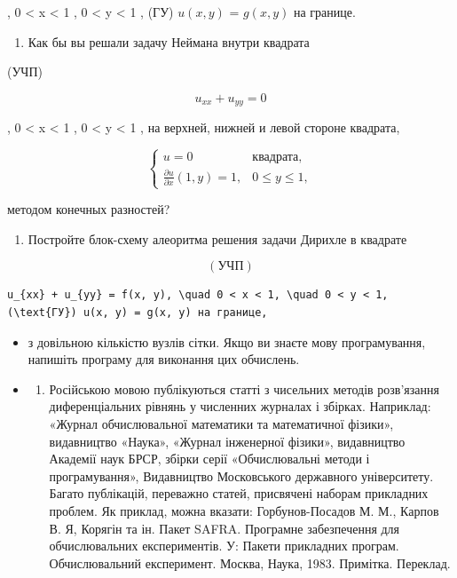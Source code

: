 \documentclass[
  ukrainian,
]{article}
\providecommand{\tightlist}{%
  \setlength{\itemsep}{0pt}\setlength{\parskip}{0pt}}
\begin{document}
, 0 \textless{} x \textless{} 1 , 0 \textless{} y \textless{} 1 , (ГУ)
\(u(x, y)\) = \(g(x, y)\) на границе.

\begin{enumerate}
\def\labelenumi{\arabic{enumi}.}
\setcounter{enumi}{4}
\tightlist
\item
  Как бы вы решали задачу Неймана внутри квадрата
\end{enumerate}

(УЧП)

\[
u_{xx} + u_{yy} = 0
\]

, 0 \textless{} x \textless{} 1 , 0 \textless{} y \textless{} 1 , на
верхней, нижней и левой стороне квадрата,

\[
\begin{cases} u = 0 & \text{квадрата,} \\ \frac{\partial u}{\partial x}(1, y) = 1, & 0 \leqslant y \leqslant 1, \end{cases}
\]

методом конечных разностей?

\begin{enumerate}
\def\labelenumi{\arabic{enumi}.}
\setcounter{enumi}{5}
\tightlist
\item
  Постройте блок-схему алеоритма решения задачи Дирихле в квадрате
\end{enumerate}

\[
(\text{УЧП})
\]

\begin{verbatim}
u_{xx} + u_{yy} = f(x, y), \quad 0 < x < 1, \quad 0 < y < 1, (\text{ГУ}) u(x, y) = g(x, y) на границе,
\end{verbatim}

\begin{itemize}
\item
  з довільною кількістю вузлів сітки. Якщо ви знаєте мову програмування,
  напишіть програму для виконання цих обчислень.
\item
  \begin{enumerate}
  \def\labelenumi{\arabic{enumi})}
  \tightlist
  \item
    Російською мовою публікуються статті з чисельних методів розв'язання
    диференціальних рівнянь у численних журналах і збірках. Наприклад:
    «Журнал обчислювальної математики та математичної фізики»,
    видавництво «Наука», «Журнал інженерної фізики», видавництво
    Академії наук БРСР, збірки серії «Обчислювальні методи і
    програмування», Видавництво Московського державного університету.
    Багато публікацій, переважно статей, присвячені наборам прикладних
    проблем. Як приклад, можна вказати: Горбунов-Посадов М. М., Карпов
    В. Я, Корягін та ін. Пакет SAFRA. Програмне забезпечення для
    обчислювальних експериментів. У: Пакети прикладних програм.
    Обчислювальний експеримент. Москва, Наука, 1983. Примітка. Переклад.
  \end{enumerate}
\end{itemize}
\end{document}
